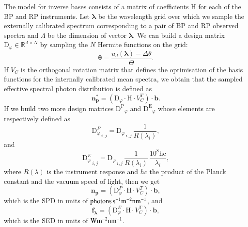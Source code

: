 \documentclass{aa}
\newcommand{\xp}{BP and RP\xspace}
\begin{document}
The model for inverse bases consists of a matrix of coefficients H for each of the \xp instruments. Let $\boldsymbol{\lambda}$ be the wavelength grid over which we sample the externally calibrated spectrum corresponding to a pair of \xp observed spectra and $\Lambda$ be the dimension of vector $\boldsymbol{\lambda}$.
We can build a design matrix $\mathrm{D}_\varphi \in\mathbb{R}^{\Lambda \times N}$  by sampling the $N$ Hermite functions on the grid:
\begin{equation}
    \boldsymbol{\theta} = \frac{u_d(\boldsymbol{\lambda}) - \Delta \theta}{\Theta}
.\end{equation}
If $V_C$ is the orthogonal rotation matrix that defines the optimisation of the basis functions for the internally calibrated mean spectra, we obtain that the sampled effective spectral photon distribution is defined as
\begin{equation}
    \mathbf{n_p^*} = \left(\mathrm{D}_\varphi \cdot \mathrm{H} \cdot V_C^T\right) \cdot \mathbf{b}
.\end{equation}
If we build two more design matrices 
$\mathrm{D^P}_\varphi$ and $\mathrm{D^E}_\varphi$
whose elements are respectively defined as
\begin{equation}
    {\mathrm{D}_\varphi^P}_{\,i, j} = {\mathrm{D}_\varphi}_{\,i, j} \,\frac{1}{ R(\lambda_i)}
    \label{eq:designSpd}
,\end{equation}
and 
\begin{equation}
    {\mathrm{D}_\varphi^E}_{\,i, j} = {\mathrm{D}_\varphi}_{\,i, j} \,\frac{1}{ R(\lambda_i)} \,\frac{10^8 \mathrm{h} \mathrm{c}}{\lambda_i}
    \label{eq:designSed}
,\end{equation}
where $R(\lambda)$ is the instrument response and $hc$ the product of the Planck constant and the vacuum speed of light, then we get
\begin{equation}
    \mathbf{n_p} = \left(\mathrm{D}_\varphi^P \cdot \mathrm{H} \cdot V_C^T\right) \cdot \mathbf{b}
    \label{eq:reconstructedSpd}
,\end{equation}
which is the SPD in units of $\rm photons\, s^{-1} m^{-2} nm^{-1}$, 
and
\begin{equation}
    \mathbf{f_\lambda} = \left(\mathrm{D}_\varphi^E \cdot \mathrm{H} \cdot V_C^T\right) \cdot \mathbf{b}
    \label{eq:reconstructedSed}
,\end{equation}
which is the SED in units of $\rm W m^{-2} nm^{-1}$.
\end{document}
